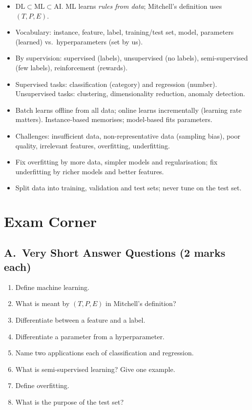 \begin{summary}
\begin{itemize}
  \item $\text{DL}\subset\text{ML}\subset\text{AI}$. ML learns \emph{rules from data}; Mitchell's definition uses $(T,P,E)$.
  \item Vocabulary: instance, feature, label, training/test set, model, parameters (learned) vs.\ hyperparameters (set by us).
  \item By supervision: supervised (labels), unsupervised (no labels), semi-supervised (few labels), reinforcement (rewards).
  \item Supervised tasks: classification (category) and regression (number). Unsupervised tasks: clustering, dimensionality reduction, anomaly detection.
  \item Batch learns offline from all data; online learns incrementally (learning rate matters). Instance-based memorises; model-based fits parameters.
  \item Challenges: insufficient data, non-representative data (sampling bias), poor quality, irrelevant features, overfitting, underfitting.
  \item Fix overfitting by more data, simpler models and regularisation; fix underfitting by richer models and better features.
  \item Split data into training, validation and test sets; never tune on the test set.
\end{itemize}
\end{summary}

\section*{Exam Corner}

\subsection*{A.\ Very Short Answer Questions (2 marks each)}
\begin{enumerate}
  \item Define machine learning. 
  \item What is meant by $(T,P,E)$ in Mitchell's definition? 
  \item Differentiate between a feature and a label. 
  \item Differentiate a parameter from a hyperparameter. 
  \item Name two applications each of classification and regression. 
  \item What is semi-supervised learning? Give one example. 
  \item Define overfitting. 
  \item What is the purpose of the test set? 
\end{enumerate}

